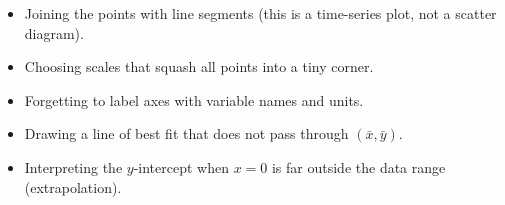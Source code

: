 \documentclass[11pt]{article}
\begin{document}
\begin{attention}
\begin{itemize}
\item Joining the points with line segments (this is a time-series plot, not a scatter diagram).
\item Choosing scales that squash all points into a tiny corner.
\item Forgetting to label axes with variable names and units.
\item Drawing a line of best fit that does not pass through $(\bar{x}, \bar{y})$.
\item Interpreting the $y$-intercept when $x=0$ is far outside the data range (extrapolation).
\end{itemize}
\end{attention}
\end{document}
